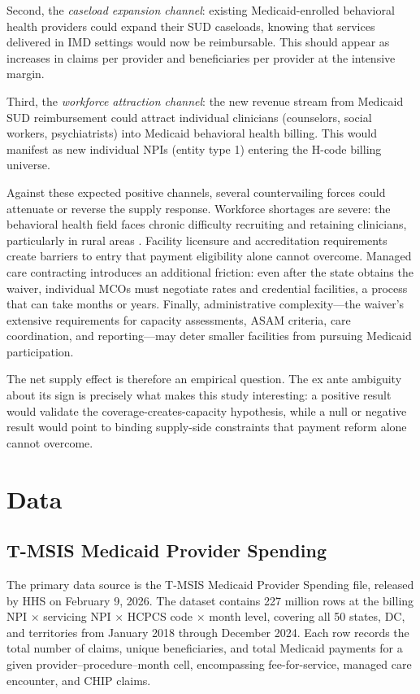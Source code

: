 \documentclass[12pt]{article}
\begin{document}
Second, the \textit{caseload expansion channel}: existing Medicaid-enrolled behavioral health providers could expand their SUD caseloads, knowing that services delivered in IMD settings would now be reimbursable. This should appear as increases in claims per provider and beneficiaries per provider at the intensive margin.

Third, the \textit{workforce attraction channel}: the new revenue stream from Medicaid SUD reimbursement could attract individual clinicians (counselors, social workers, psychiatrists) into Medicaid behavioral health billing. This would manifest as new individual NPIs (entity type 1) entering the H-code billing universe.

Against these expected positive channels, several countervailing forces could attenuate or reverse the supply response. Workforce shortages are severe: the behavioral health field faces chronic difficulty recruiting and retaining clinicians, particularly in rural areas \citep{haffajee2019characteristics}. Facility licensure and accreditation requirements create barriers to entry that payment eligibility alone cannot overcome. Managed care contracting introduces an additional friction: even after the state obtains the waiver, individual MCOs must negotiate rates and credential facilities, a process that can take months or years. Finally, administrative complexity---the waiver's extensive requirements for capacity assessments, ASAM criteria, care coordination, and reporting---may deter smaller facilities from pursuing Medicaid participation.

The net supply effect is therefore an empirical question. The ex ante ambiguity about its sign is precisely what makes this study interesting: a positive result would validate the coverage-creates-capacity hypothesis, while a null or negative result would point to binding supply-side constraints that payment reform alone cannot overcome.


\section{Data}

\subsection{T-MSIS Medicaid Provider Spending}

The primary data source is the T-MSIS Medicaid Provider Spending file, released by HHS on February 9, 2026. The dataset contains 227 million rows at the billing NPI $\times$ servicing NPI $\times$ HCPCS code $\times$ month level, covering all 50 states, DC, and territories from January 2018 through December 2024. Each row records the total number of claims, unique beneficiaries, and total Medicaid payments for a given provider--procedure--month cell, encompassing fee-for-service, managed care encounter, and CHIP claims.
\end{document}
